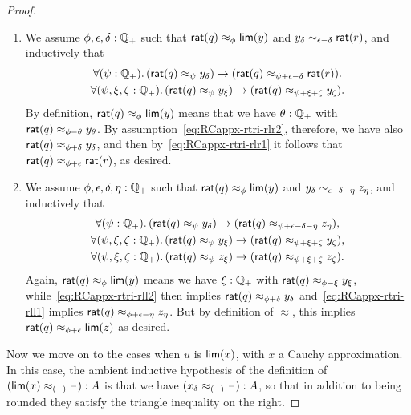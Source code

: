 \begin{proof}
\begin{enumerate}
  \item We assume $\phi,\epsilon,\delta:\mathbb{Q}_{+}$ such that $\mathsf{rat}(q)\approx_\phi \mathsf{lim}(y)$ and $y_\delta \sim_{\epsilon-\delta} \mathsf{rat}(r)$, and inductively that
    \begin{gather}
      \fall{\psi:\Qp}(\rcrat(q) \approx_{\psi} y_\delta) \to (\rcrat(q) \approx_{\psi+\epsilon-\delta} \rcrat(r)).\label{eq:RCappx-rtri-rlr1}\\
      \fall{\psi,\xi,\zeta:\Qp} (\rcrat(q) \approx_{\psi} y_\xi) \to (\rcrat(q) \approx_{\psi+\xi+\zeta} y_\zeta).\label{eq:RCappx-rtri-rlr2}
    \end{gather}
    By definition, $\mathsf{rat}(q)\approx_\phi \mathsf{lim}(y)$ means that we have $\theta:\mathbb{Q}_{+}$ with $\mathsf{rat}(q) \approx_{\phi-\theta} y_\theta$.
    By assumption~\eqref{eq:RCappx-rtri-rlr2}, therefore, we have also $\mathsf{rat}(q) \approx_{\phi+\delta} y_\delta$, and then by~\eqref{eq:RCappx-rtri-rlr1} it follows that $\mathsf{rat}(q) \approx_{\phi+\epsilon} \mathsf{rat}(r)$, as desired.
  \item We assume $\phi,\epsilon,\delta,\eta:\mathbb{Q}_{+}$ such that $\mathsf{rat}(q)\approx_\phi \mathsf{lim}(y)$ and $y_\delta \sim_{\epsilon-\delta-\eta} z_\eta$, and inductively that 
    \begin{gather}
      \fall{\psi:\Qp}(\rcrat(q) \approx_{\psi} y_\delta) \to (\rcrat(q) \approx_{\psi+\epsilon-\delta-\eta} z_\eta), \label{eq:RCappx-rtri-rll1}\\
      \fall{\psi,\xi,\zeta:\Qp} (\rcrat(q) \approx_{\psi} y_\xi) \to (\rcrat(q) \approx_{\psi+\xi+\zeta} y_\zeta), \label{eq:RCappx-rtri-rll2}\\
      \fall{\psi,\xi,\zeta:\Qp} (\rcrat(q) \approx_{\psi} z_\xi) \to (\rcrat(q) \approx_{\psi+\xi+\zeta} z_\zeta). \label{eq:RCappx-rtri-rll3}
    \end{gather}
    Again, $\mathsf{rat}(q)\approx_\phi \mathsf{lim}(y)$ means we have $\xi:\mathbb{Q}_{+}$ with $\mathsf{rat}(q) \approx_{\phi-\xi} y_\xi$, while~\eqref{eq:RCappx-rtri-rll2} then implies $\mathsf{rat}(q) \approx_{\phi+\delta} y_\delta$ and~\eqref{eq:RCappx-rtri-rll1} implies $\mathsf{rat}(q) \approx_{\phi+\epsilon-\eta} z_\eta$.
    But by definition of $\approx$, this implies $\mathsf{rat}(q) \approx_{\phi+\epsilon} \mathsf{lim}(z)$ as desired.
  \end{enumerate}
  Now we move on to the cases when $u$ is $\mathsf{lim}(x)$, with $x$ a Cauchy approximation.
  In this case, the ambient inductive hypothesis of the definition of $(\mathsf{lim}(x) \approx_{(\mathord{\hspace{1pt}\text{--}\hspace{1pt}})} {\mathord{\hspace{1pt}\text{--}\hspace{1pt}}}) : A$ is that we have ${(x_\delta \approx_{(\mathord{\hspace{1pt}\text{--}\hspace{1pt}})} {\mathord{\hspace{1pt}\text{--}\hspace{1pt}}})}: A$, so that in addition to being rounded they satisfy the triangle inequality on the right.

\end{proof}
